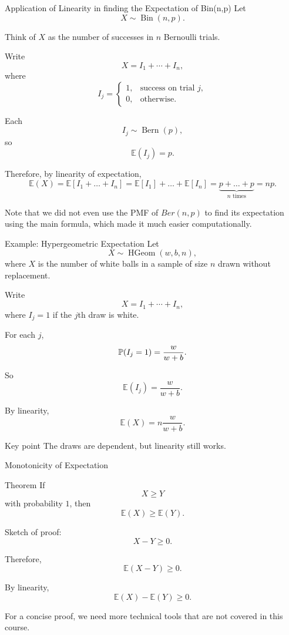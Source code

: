 \begin{frame}{Application of Linearity in finding the Expectation of Bin(n,p)}
Let
\[
X\sim \operatorname{Bin}(n,p).
\]

Think of $X$ as the number of successes in $n$ Bernoulli trials.

Write
\[
X=I_1+\cdots+I_n,
\]
where
\[
I_j=
\begin{cases}
1,&\text{success on trial }j,\\
0,&\text{otherwise}.
\end{cases}
\]

Each
\[
I_j\sim \operatorname{Bern}(p),
\]
so
\[
\mathbb{E}(I_j)=p.
\]

Therefore, by linearity of expectation,
\[
\mathbb{E}(X)
=
\mathbb{E}[I_1 + \dots + I_n]
=
\mathbb{E}[I_1] + \dots + \mathbb{E}[I_n]
=
\underbrace{p+\dots+p}_{n\text{ times}}
=
np.
\]

Note that we did not even use the PMF of $Ber(n,p)$ to find its expectation using the main formula, which made it much easier computationally.
\end{frame}

\begin{frame}{Example: Hypergeometric Expectation}
Let
\[
X\sim \operatorname{HGeom}(w,b,n),
\]
where $X$ is the number of white balls in a sample of size $n$ drawn without replacement.

Write
\[
X=I_1+\cdots+I_n,
\]
where $I_j=1$ if the $j$th draw is white.

For each $j$,
\[
\mathbb{P}(I_j=1)=\frac{w}{w+b}.
\]

So
\[
\mathbb{E}(I_j)=\frac{w}{w+b}.
\]

By linearity,
\[
\boxed{
\mathbb{E}(X)=n\frac{w}{w+b}.
}
\]

\begin{livebox}{Key point}
The draws are dependent, but linearity still works.
\end{livebox}
\end{frame}

\begin{frame}{Monotonicity of Expectation}
\begin{keybox}{Theorem}
If
\[
X\geq Y
\]
with probability $1$, then
\[
\mathbb{E}(X)\geq \mathbb{E}(Y).
\]
\end{keybox}

\vspace{0.25cm}

Sketch of proof:
\[
X-Y\geq 0.
\]

Therefore,
\[
\mathbb{E}(X-Y)\geq0.
\]

By linearity,
\[
\mathbb{E}(X)-\mathbb{E}(Y)\geq0.
\]

For a concise proof, we need more technical tools that are not covered in this course.
\end{frame}















